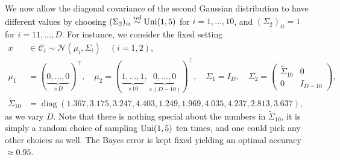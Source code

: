 \documentclass[aps,preprint,nofootinbib,floatfix]{revtex4-1}
\DeclareMathOperator{\diag}{diag}
\newcommand\C{{\mathcal{C}}}
\begin{document}
We now allow the diagonal covariance of the second Gaussian distribution to
have different values by choosing
$(\Sigma_2)_{ii} \stackrel{iid}{\sim} \textnormal{Uni}(1,5)$ for
$i=1,\dotsc,10$, and $(\Sigma_2)_{ii} = 1$ for $i=11,\dotsc,D$. For instance,
we consider the fixed setting
\begin{equation}
\label{eq:gauss2}
\begin{split}
x & \in \C_i  \sim 
\mathcal{N}(\mu_i,\Sigma_i) \quad (i=1,2),  \\
\mu_1 &= (\underbrace{0,\dotsc,0}_{\times D})^\top , \quad
\mu_2 = (\underbrace{1,\dots,1}_{\times 10},
\underbrace{0,\dots,0}_{\times (D-10)})^\top, \quad
\Sigma_1 = I_D, \quad
\Sigma_2 = \left( \begin{array}{c|c}
\widetilde{\Sigma}_{10} & 0 \\ \hline 
0 & I_{D-10} \end{array}\right), \\
\widetilde{\Sigma}_{10} &= \diag(1.367,  3.175,  3.247,  4.403,  1.249,
1.969, 4.035,   4.237,  2.813,  3.637),
\end{split}
\end{equation}
as we vary $D$. Note that there is nothing special about the numbers in
$\widetilde{\Sigma}_{10}$, it is simply a random choice of sampling
$\textnormal{Uni}(1,5)$ ten times, and one could pick any other choices
as well.
The Bayes error is kept fixed yielding
an optimal accuracy $\approx 0.95$.
\end{document}
